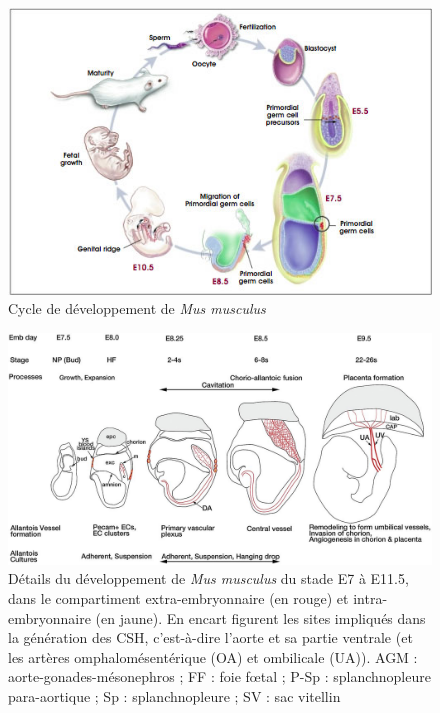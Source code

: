 \documentclass[fleqn,11pt]{SelfArx} %
\begin{document}
\begin{figure}[ht]
\centering
\includegraphics[width=\linewidth]{images/devptCycle}
\caption{Cycle de développement de \textit{Mus musculus}}
\label{fig:devptCycle}
\end{figure}

\begin{figure}[ht]
\centering
\includegraphics[width=\linewidth]{images/devpt}
\caption{Détails du développement de \textit{Mus musculus}\cite{Gaudin} du stade E7 à E11.5, dans le compartiment extra-embryonnaire (en rouge) et intra-embryonnaire (en jaune). En encart figurent les sites impliqués dans la génération des CSH, c’est-à-dire l’aorte et sa partie ventrale (et les artères omphalomésentérique (OA) et ombilicale (UA)). AGM : aorte-gonades-mésonephros ; FF : foie fœtal ; P-Sp : splanchnopleure para-aortique ; Sp : splanchnopleure ; SV : sac vitellin}
\label{fig:devpt}
\end{figure}
\end{document}
